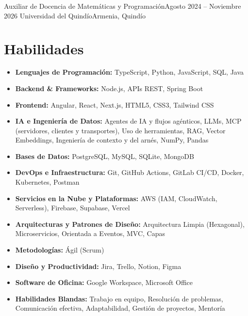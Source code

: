 \documentclass[letterpaper,12pt]{fed-res}
\begin{document}
    \resumeSubheading
        {Auxiliar de Docencia de Matemáticas y Programación}{Agosto 2024 -- Noviembre 2026}
        {Universidad del Quindío}{Armenia, Quindío}
        \resumeItemListStart
        \resumeItemListEnd
\resumeSubHeadingListEnd

\section{Habilidades}
\begin{itemize}[leftmargin=0.15in, label={}]
    \item \textbf{Lenguajes de Programación:} TypeScript, Python, JavaScript, SQL, Java
    \item \textbf{Backend \& Frameworks:} Node.js, APIs REST, Spring Boot
    \item \textbf{Frontend:} Angular, React, Next.js, HTML5, CSS3, Tailwind CSS
    \item \textbf{IA e Ingeniería de Datos:} Agentes de IA y flujos agénticos, LLMs, MCP (servidores, clientes y transportes), Uso de herramientas, RAG, Vector Embeddings, Ingeniería de contexto y del arnés, NumPy, Pandas
    \item \textbf{Bases de Datos:} PostgreSQL, MySQL, SQLite, MongoDB
    \item \textbf{DevOps e Infraestructura:} Git, GitHub Actions, GitLab CI/CD, Docker, Kubernetes, Postman
    \item \textbf{Servicios en la Nube y Plataformas:} AWS (IAM, CloudWatch, Serverless), Firebase, Supabase, Vercel
    \item \textbf{Arquitecturas y Patrones de Diseño:} Arquitectura Limpia (Hexagonal), Microservicios, Orientada a Eventos, MVC, Capas
    \item \textbf{Metodologías:} Ágil (Scrum)
    \item \textbf{Diseño y Productividad:} Jira, Trello, Notion, Figma
    \item \textbf{Software de Oficina:} Google Workspace, Microsoft Office
    \item \textbf{Habilidades Blandas:} Trabajo en equipo, Resolución de problemas, Comunicación efectiva, Adaptabilidad, Gestión de proyectos, Mentoría
\end{itemize}
\end{document}
